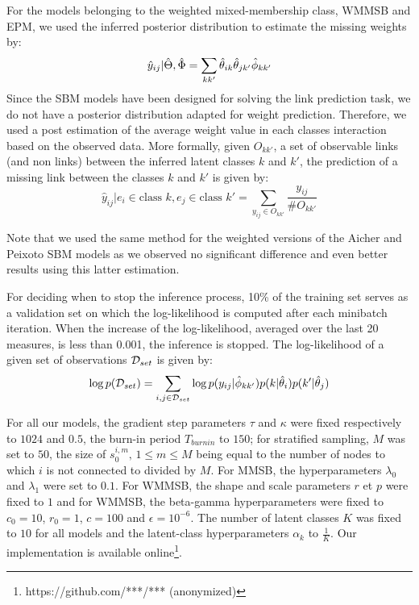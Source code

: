 For the models belonging to the weighted mixed-membership class, WMMSB and EPM, we used the inferred posterior distribution to estimate the missing weights by:
\[
\hat y_{ij} | \hat\Theta, \hat\Phi = \sum_{kk'} \hat\theta_{ik} \hat\theta_{jk'} \hat\phi_{kk'}
\]
Since the SBM models have been designed for solving the link prediction task, we do not have a posterior distribution adapted for weight prediction. Therefore, we used a post estimation of the average weight value in each classes interaction based on the observed data. More formally, given $O_{kk'}$, a set of observable links (and non links) between the inferred latent classes $k$ and $k'$, the prediction of a missing link between the classes $k$ and $k'$ is given by:
\[
\hat y_{ij} | e_i \in \text{class } k, e_j \in \text{class }k' = \sum_{y_{ij} \in O_{kk'}} \frac{y_{ij}}{\# O_{kk'}}
\]

Note that we used the same method for the weighted versions of the Aicher and Peixoto SBM models as we observed no significant difference and even better results using this latter estimation.


For deciding when to stop the inference process, 10\% of the training set serves as a validation set on which the log-likelihood is computed after each minibatch iteration. When the increase of the log-likelihood, averaged over the last 20 measures, is less than 0.001, the inference is stopped. The log-likelihood of a given set of observations $\mathcal{D}_{set}$  is given by:
\begin{equation*}
\log p(\mathcal{D}_{set}) = \sum_{i,j \in \mathcal{D}_{set}} \log p(y_{ij} | \hat\phi_{kk'}) p(k|\hat\theta_i) p(k'|\hat\theta_j)
\end{equation*}

For all our models, the gradient step parameters  $\tau$ and $\kappa$ were fixed respectively to  $1024$ and $0.5$, the burn-in period $T_{burnin}$ to $150$; for stratified sampling, $M$ was set to $50$, the size of $s_0^{i,m}, \, 1 \le m \le M$ being equal to the number of nodes to which $i$ is not connected to divided by $M$. For MMSB, the hyperparameters $\lambda_0$ and $\lambda_1$ were set to $0.1$. For WMMSB, the shape and scale parameters $r$ et $p$ were fixed to $1$ and for WMMSB, the beta-gamma hyperparameters were fixed to  $c_0=10$, $r_0=1$, $c=100$ and $\epsilon=10^{-6}$. The number of latent classes $K$ was fixed to $10$ for all models and the latent-class hyperparameters $\alpha_k$ to $\frac{1}{K}$. Our implementation is available online\footnote{https://github.com/***/*** (anonymized)}. 


